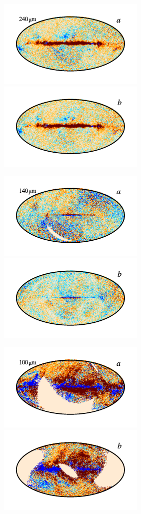 \documentclass{aa}
\begin{document}
\begin{figure}
	\centering
	\includegraphics{figs/res_maps/res_10a_c0001_000022.pdf}\includegraphics{figs/res_maps/res_10b_c0001_000022.pdf}
  \vspace*{-0.85cm}

	\includegraphics{figs/res_maps/res_09a_c0001_000022.pdf}\includegraphics{figs/res_maps/res_09b_c0001_000022.pdf}
  \vspace*{-0.85cm}

	\includegraphics{figs/res_maps/res_08a_c0001_000022.pdf}\includegraphics{figs/res_maps/res_08b_c0001_000022.pdf}
  \vspace*{-0.85cm}


\end{figure}
\end{document}
